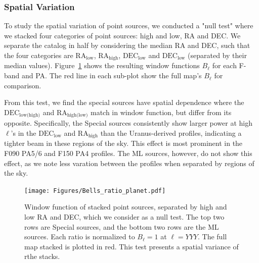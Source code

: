 \subsubsection{Spatial Variation}
\label{subsubsec:null_mainbeam}

To study the spatial variation of point sources, we conducted a "null test" where we stacked four categories of point sources: high and low, RA and DEC.  We separate the catalog in half by considering the median RA and DEC, such that the four categories are $\text{RA}_{\text{low}}$, $\text{RA}_{\text{high}}$, $\text{DEC}_{\text{low}}$ and $\text{DEC}_{\text{low}}$ (separated by their median values). 
 Figure~\ref{fig:bells} shows the resulting window functions $B_{\ell}$ for each F-band and PA.  The red line in each sub-plot show the full map's $B_{\ell}$ for comparison.

From this test, we find the special sources have spatial dependence where the $\text{DEC}_{\text{low(high)}}$ and $\text{RA}_{\text{high(low)}}$ match in window function, but differ from its opposite.  Specifically, the Special sources consistently show larger power at high $\ell$'s in the $\text{DEC}_{\text{low}}$ and $\text{RA}_{\text{high}}$ than the Uranus-derived profiles, indicating a tighter beam in these regions of the sky.  This effect is most prominent in the F090 PA5/6 and F150 PA4 profiles.  The ML sources, however, do not show this effect, as we note less varation between the profiles when separated by regions of the sky.

\begin{figure}
    \centering
    \texttt{[image: Figures/Bells\_ratio\_planet.pdf]}
    \caption{Window function of stacked point sources, separated by high and low RA and DEC, which we consider as a null test.  The top two rows are Special sources, and the bottom two rows are the ML sources.  Each ratio is normalized to $B_\ell =1$ at $\ell=YYY$.  The full map stacked is plotted in red.  This test presents a spatial variance of rthe stacks.}
    \label{fig:bells}
\end{figure}

